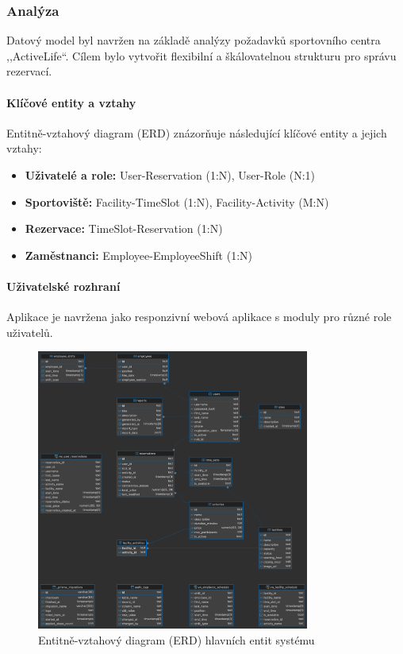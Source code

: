\documentclass[12pt, a4paper]{article}
\begin{document}
\subsubsection{Analýza}
\label{subsubsec:analyza}

Datový model byl navržen na základě analýzy požadavků sportovního centra ,,ActiveLife``. Cílem bylo vytvořit flexibilní a škálovatelnou strukturu pro správu rezervací.

\paragraph{Klíčové entity a vztahy}
Entitně-vztahový diagram (ERD) znázorňuje následující klíčové entity a jejich vztahy:

\begin{itemize}
    \item \textbf{Uživatelé a role:} User-Reservation (1:N), User-Role (N:1)
    \item \textbf{Sportoviště:} Facility-TimeSlot (1:N), Facility-Activity (M:N)
    \item \textbf{Rezervace:} TimeSlot-Reservation (1:N)
    \item \textbf{Zaměstnanci:} Employee-EmployeeShift (1:N)
\end{itemize}

\paragraph{Uživatelské rozhraní}
Aplikace je navržena jako responzivní webová aplikace s moduly pro různé role uživatelů.

\begin{figure}[htbp]
    \centering
    \includegraphics[width=0.8\textwidth]{erd_diagram.png}
    \caption{Entitně-vztahový diagram (ERD) hlavních entit systému}
    \label{fig:erd}
\end{figure}
\end{document}
